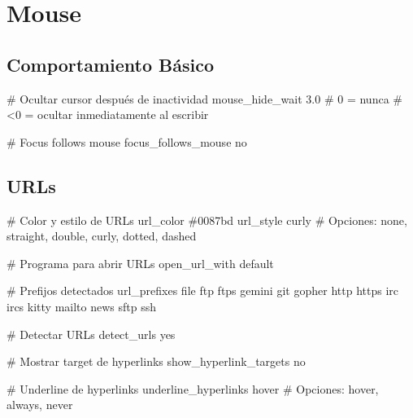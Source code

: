 \documentclass[
  doc,
  floatsintext,
  longtable,
  a4paper,
  nolmodern,
  notxfonts,
  notimes,
  12pt,
  colorlinks=true,linkcolor=blue,citecolor=blue,urlcolor=blue]{apa7}
\newenvironment{Shaded}{\begin{snugshade}}{\end{snugshade}}
\newcommand{\CommentTok}[1]{\textcolor[rgb]{0.37,0.37,0.37}{#1}}
\newcommand{\DataTypeTok}[1]{\textcolor[rgb]{0.68,0.00,0.00}{#1}}
\newcounter{none} %
\begin{document}
\section{Mouse}\label{mouse}

\subsection{Comportamiento Básico}\label{comportamiento-buxe1sico}

\begin{Shaded}
\begin{Highlighting}[]
\CommentTok{\# Ocultar cursor después de inactividad}
\DataTypeTok{mouse\_hide\_wait} \DataTypeTok{3.0}
\CommentTok{\# 0 = nunca}
\CommentTok{\# \textless{}0 = ocultar inmediatamente al escribir}

\CommentTok{\# Focus follows mouse}
\DataTypeTok{focus\_follows\_mouse} \DataTypeTok{no}
\end{Highlighting}
\end{Shaded}

\subsection{URLs}\label{urls}

\begin{Shaded}
\begin{Highlighting}[]
\CommentTok{\# Color y estilo de URLs}
\DataTypeTok{url\_color} \CommentTok{\#0087bd}
\DataTypeTok{url\_style} \DataTypeTok{curly}
\CommentTok{\# Opciones: none, straight, double, curly, dotted, dashed}

\CommentTok{\# Programa para abrir URLs}
\DataTypeTok{open\_url\_with} \DataTypeTok{default}

\CommentTok{\# Prefijos detectados}
\DataTypeTok{url\_prefixes} \DataTypeTok{file} \DataTypeTok{ftp} \DataTypeTok{ftps} \DataTypeTok{gemini} \DataTypeTok{git} \DataTypeTok{gopher} \DataTypeTok{http} \DataTypeTok{https} \DataTypeTok{irc} \DataTypeTok{ircs} \DataTypeTok{kitty} \DataTypeTok{mailto} \DataTypeTok{news} \DataTypeTok{sftp} \DataTypeTok{ssh}

\CommentTok{\# Detectar URLs}
\DataTypeTok{detect\_urls} \DataTypeTok{yes}

\CommentTok{\# Mostrar target de hyperlinks}
\DataTypeTok{show\_hyperlink\_targets} \DataTypeTok{no}

\CommentTok{\# Underline de hyperlinks}
\DataTypeTok{underline\_hyperlinks} \DataTypeTok{hover}
\CommentTok{\# Opciones: hover, always, never}
\end{Highlighting}
\end{Shaded}
\end{document}
